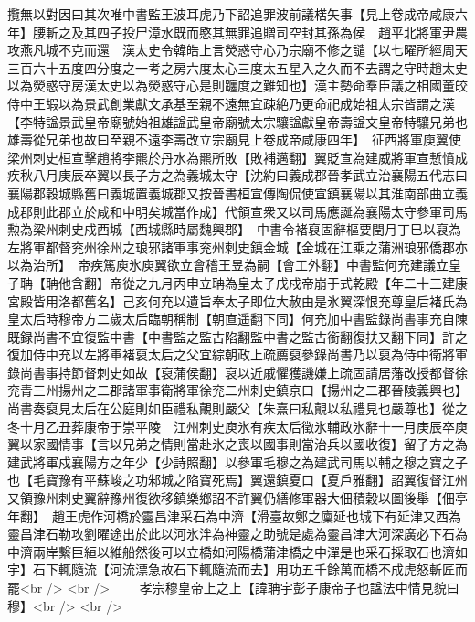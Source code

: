 攬無以對因曰其次唯中書監王波耳虎乃下詔追罪波前議楛矢事【見上卷成帝咸康六年】腰斬之及其四子投尸漳水既而愍其無罪追贈司空封其孫為侯　趙平北將軍尹農攻燕凡城不克而還　漢太史令韓皓上言熒惑守心乃宗廟不修之譴【以七曜所經周天三百六十五度四分度之一考之房六度太心三度太五星入之久而不去謂之守時趙太史以為熒惑守房漢太史以為熒惑守心是則躔度之難知也】漢主勢命羣臣議之相國董皎侍中王嘏以為景武創業獻文承基至親不遠無宜疎絶乃更命祀成始祖太宗皆謂之漢【李特諡景武皇帝廟號始祖雄諡武皇帝廟號太宗驤諡獻皇帝壽諡文皇帝特驤兄弟也雄壽從兄弟也故曰至親不遠李壽改立宗廟見上卷成帝咸康四年】　征西將軍庾翼使梁州刺史桓宣擊趙將李羆於丹水為羆所敗【敗補邁翻】翼貶宣為建威將軍宣慙憤成疾秋八月庚辰卒翼以長子方之為義城太守【沈約曰義成郡晉孝武立治襄陽五代志曰襄陽郡穀城縣舊曰義城置義城郡又按晉書桓宣傳陶侃使宣鎮襄陽以其淮南部曲立義成郡則此郡立於咸和中明矣城當作成】代領宣衆又以司馬應誕為襄陽太守參軍司馬勲為梁州刺史戍西城【西城縣時屬魏興郡】　中書令褚裒固辭樞要閏月丁巳以裒為左將軍都督兖州徐州之琅邪諸軍事兖州刺史鎮金城【金城在江乘之蒲洲琅邪僑郡亦以為治所】　帝疾篤庾氷庾翼欲立會稽王昱為嗣【會工外翻】中書監何充建議立皇子聃【聃他含翻】帝從之九月丙申立聃為皇太子戊戍帝崩于式乾殿【年二十三建康宮殿皆用洛都舊名】己亥何充以遺旨奉太子即位大赦由是氷翼深恨充尊皇后褚氏為皇太后時穆帝方二歲太后臨朝稱制【朝直遥翻下同】何充加中書監錄尚書事充自陳既録尚書不宜復監中書【中書監之監古陷翻監中書之監古銜翻復扶又翻下同】許之復加侍中充以左將軍褚裒太后之父宜綜朝政上疏薦裒參錄尚書乃以裒為侍中衛將軍錄尚書事持節督刺史如故【裒蒲侯翻】裒以近戚懼獲譏嫌上疏固請居藩改授都督徐兖青三州揚州之二郡諸軍事衛將軍徐兖二州刺史鎮京口【揚州之二郡晉陵義興也】尚書奏裒見太后在公庭則如臣禮私覿則嚴父【朱熹曰私覿以私禮見也嚴尊也】從之　冬十月乙丑葬康帝于崇平陵　江州刺史庾氷有疾太后徵氷輔政氷辭十一月庚辰卒庾翼以家國情事【言以兄弟之情則當赴氷之喪以國事則當治兵以國收復】留子方之為建武將軍戍襄陽方之年少【少詩照翻】以參軍毛穆之為建武司馬以輔之穆之寶之子也【毛寶豫有平蘇峻之功邾城之陷寶死焉】翼還鎮夏口【夏戶雅翻】詔翼復督江州又領豫州刺史翼辭豫州復欲移鎮樂鄉詔不許翼仍繕修軍器大佃積穀以圖後舉【佃亭年翻】　趙王虎作河橋於靈昌津采石為中濟【滑臺故鄭之廩延也城下有延津又西為靈昌津石勒攻劉曜途出於此以河氷泮為神靈之助號是處為靈昌津大河深廣必下石為中濟兩岸繫巨絙以維船然後可以立橋如河陽橋蒲津橋之中潬是也采石採取石也濟如宇】石下輒隨流【河流漂急故石下輒隨流而去】用功五千餘萬而橋不成虎怒斬匠而罷<br />
<br />
　　孝宗穆皇帝上之上【諱聃宇彭子康帝子也諡法中情見貌曰穆】<br />
<br />
